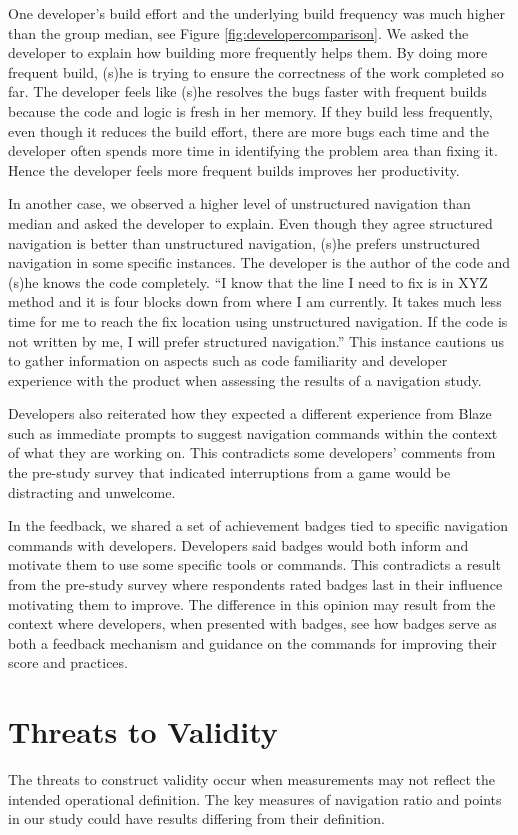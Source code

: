 \documentclass{sig-alternate}
\begin{document}
One developer's build effort and the underlying build frequency was much higher than the group median, see Figure \ref{fig:developercomparison}.  We asked the developer to explain how building more frequently helps them. By doing more frequent build, (s)he is trying to ensure the correctness of the work completed so far. The developer feels like (s)he resolves the bugs faster with frequent builds because the code and logic is fresh in her memory. If they build less frequently, even though it reduces the build effort, there are more bugs each time and the developer often spends more time in identifying the problem area than fixing it. Hence the developer feels more frequent builds improves her productivity.  

In another case, we observed a higher level of unstructured navigation than median and asked the developer to explain.  Even though they agree  structured navigation is better than unstructured navigation, (s)he prefers unstructured navigation in some specific instances. The developer is the author of the code and (s)he knows the code completely. ``I know that the line I need to fix is in XYZ method and it is four blocks down from where I am currently. It takes much less time for me to reach the fix location using unstructured navigation. If the code is not written by me, I will prefer structured navigation.'' This instance cautions us to gather information on aspects such as code familiarity and developer experience with the product when assessing the results of a navigation study.

Developers also reiterated how they expected a different experience from Blaze  such as immediate prompts to suggest navigation commands within the context of what they are working on.  This contradicts some developers' comments from the pre-study survey that indicated interruptions from a game would be distracting and unwelcome.

In the feedback, we shared a set of achievement badges tied to specific navigation commands with developers.   Developers said badges would both inform and motivate them to use some specific tools or commands.   This contradicts a result from the pre-study survey where respondents rated badges last in their influence motivating them to improve.  The difference in this opinion may result from the context where developers, when presented with badges, see how badges serve as both a feedback mechanism and guidance on the commands for improving their score and practices.

\section{Threats to Validity}
The threats to construct validity occur when measurements may not reflect the intended operational definition. The key measures of navigation ratio and points in our study could have results differing from their definition.  
\end{document}
